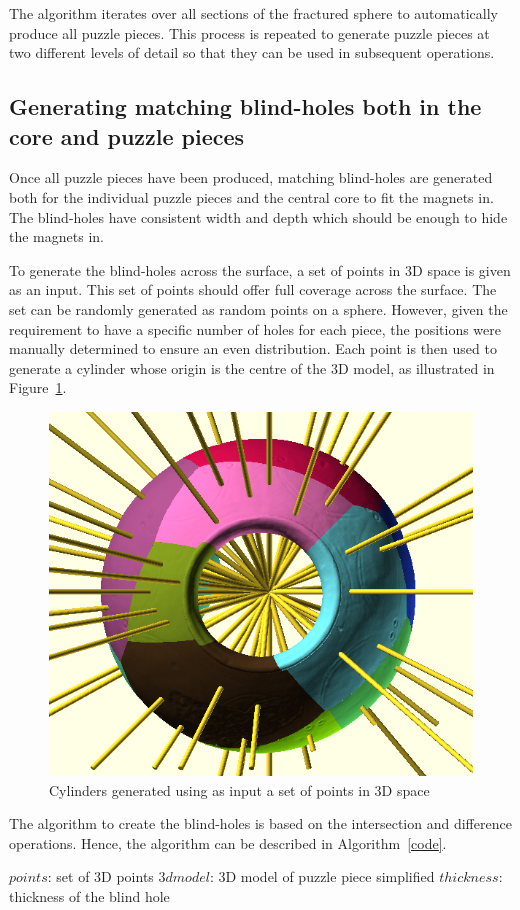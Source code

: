 \documentclass[acmlarge,screen,dvipsnames]{acmart}
\begin{document}
The algorithm iterates over all sections of the fractured sphere to
automatically produce all puzzle pieces. This process is repeated to
generate puzzle pieces at two different levels of detail so that they
can be used in subsequent operations.

\subsection{Generating matching blind-holes both in the core and puzzle pieces}

Once all puzzle pieces have been produced, matching blind-holes are
generated both for the individual puzzle pieces and the central core
to fit the magnets in. The blind-holes have consistent width and depth
which should be enough to hide the magnets in.

To generate the blind-holes across the surface, a set of points in 3D
space is given as an input. This set of points should offer full
coverage across the surface. The set can be randomly generated as
random points on a sphere. However, given the requirement to have a
specific number of holes for each piece, the positions were manually
determined to ensure an even distribution. Each point is then used to
generate a cylinder whose origin is the centre of the 3D model, as
illustrated in Figure~\ref{fig:cylinders}.
%
\begin{figure}[h]
  \centering
  \includegraphics[width=0.6\linewidth]{images/allcylinders.jpg}
  \caption{\label{fig:cylinders}
    Cylinders generated using as input a set of points in 3D space}
\end{figure}

The algorithm to create the blind-holes is based on the intersection
and difference operations. Hence, the algorithm can be described in
Algorithm~\ref{code}.
%
\begin{algorithm}
   $points$: set of 3D points\;
   $3dmodel$: 3D model of puzzle piece simplified\;
   $thickness$: thickness of the blind hole\;
  \caption{\label{code}%
    Algorithm pseudo-code to generate geometries for blind-holes in puzzle pieces}
\end{algorithm}
\end{document}
